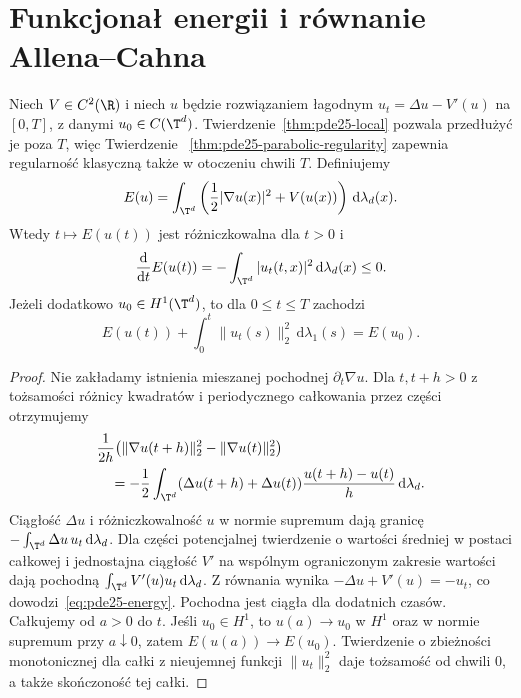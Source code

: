\section{Funkcjonał energii i równanie Allena--Cahna}
\begin{twierdzenie}
\label{thm:pde25-energy}
Niech $V\in C^2(\R)$ i niech $u$ będzie rozwiązaniem
łagodnym $u_t=\Delta u-V'(u)$ na $[0,T]$, z danymi
$u_0\in C(\T^d)$. Twierdzenie~\ref{thm:pde25-local}
pozwala przedłużyć je poza $T$, więc Twierdzenie
~\ref{thm:pde25-parabolic-regularity} zapewnia
regularność klasyczną także w otoczeniu chwili $T$.
Definiujemy
\[
 E(u)=\int_{\T^d}\left(
 \frac12|\nabla u(x)|^2+V(u(x))\right)
 \,\mathrm d\lambda_d(x).
\]
Wtedy $t\mapsto E(u(t))$ jest różniczkowalna dla
$t>0$ i
\begin{equation}\label{eq:pde25-energy}
 \frac{\mathrm d}{\mathrm dt}E(u(t))
 =-\int_{\T^d}|u_t(t,x)|^2\,\mathrm d\lambda_d(x)\le0.
\end{equation}
Jeżeli dodatkowo $u_0\in H^1(\T^d)$, to dla
$0\le t\le T$ zachodzi
\[
 E(u(t))+\int_0^t\|u_t(s)\|_2^2\,
                  \mathrm d\lambda_1(s)=E(u_0).
\]
\end{twierdzenie}
\begin{proof}
Nie zakładamy istnienia mieszanej pochodnej
$\partial_t\nabla u$. Dla $t,t+h>0$ z tożsamości
różnicy kwadratów i periodycznego całkowania przez
części otrzymujemy
\[
 \begin{aligned}
 &\frac{1}{2h}\bigl(\|\nabla u(t+h)\|_2^2-
                       \|\nabla u(t)\|_2^2\bigr)\\
 &\quad=-\frac12\int_{\T^d}
    (\Delta u(t+h)+\Delta u(t))
    \frac{u(t+h)-u(t)}h\,\mathrm d\lambda_d .
 \end{aligned}
\]
Ciągłość $\Delta u$ i różniczkowalność $u$ w normie
supremum dają granicę $-\int_{\T^d}\Delta u\,u_t\,
\mathrm d\lambda_d$. Dla części potencjalnej
twierdzenie o wartości średniej w postaci całkowej
i jednostajna ciągłość $V'$ na wspólnym ograniczonym
zakresie wartości dają pochodną
$\int_{\T^d}V'(u)u_t\,\mathrm d\lambda_d$.
Z równania wynika $-\Delta u+V'(u)=-u_t$,
co dowodzi~\eqref{eq:pde25-energy}.
Pochodna jest ciągła dla dodatnich czasów.
Całkujemy od $a>0$ do $t$. Jeśli $u_0\in H^1$,
to $u(a)\to u_0$ w $H^1$ oraz w normie supremum
przy $a\downarrow0$, zatem $E(u(a))\to E(u_0)$.
Twierdzenie o zbieżności monotonicznej dla całki
z nieujemnej funkcji $\|u_t\|_2^2$ daje tożsamość
od chwili $0$, a także skończoność tej całki.
\end{proof}

